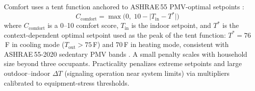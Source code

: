 \documentclass[final,3p,times]{elsarticle}
\begin{document}
Comfort uses a tent function anchored to ASHRAE\,55 PMV-optimal setpoints
\cite{ashrae55_2020,vanhoof2008,fanger1970}:
\begin{equation}
  C_{\mathrm{comfort}} = \max\!\bigl(0,\; 10 - \lvert T_{\mathrm{in}} - T^{*}\rvert\bigr)
  \label{eq:hvac_comfort}
\end{equation}
\noindent where $C_{\mathrm{comfort}}$ is a 0--10 comfort score, $T_{\mathrm{in}}$ is the indoor setpoint,
and $T^{*}$ is the context-dependent optimal setpoint used as the peak of the tent function:
$T^{*} = 76$\,\textdegree{}F in cooling mode ($T_{\mathrm{out}} > 75$\,\textdegree{}F)
and $70$\,\textdegree{}F in heating mode, consistent with ASHRAE\,55-2020 sedentary PMV bands
\cite{ashrae55_2020}. A small penalty scales with household size beyond three occupants.
Practicality penalizes extreme setpoints and large outdoor--indoor $\Delta T$
(signaling operation near system limits) via multipliers calibrated to equipment-stress thresholds.
\end{document}
